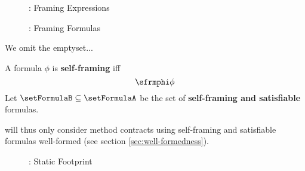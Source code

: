 
\begin{figure}
    
    \caption{\svlidf: Framing Expressions}
\end{figure}

\begin{figure}
    
    \caption{\svlidf: Framing Formulas}
\end{figure}

We omit the emptyset... 

\begin{definition}
    A formula $\phi$ is \textbf{self-framing} iff
    \begin{displaymath}
    \sfrmphi \phi
    \end{displaymath}
    Let $\setFormulaB \subseteq \setFormulaA$ be the set of \textbf{self-framing and satisfiable} formulas.
\end{definition}


\svl will thus only consider method contracts using self-framing and satisfiable formulas well-formed (see section \ref{sec:well-formedness}).

\begin{figure}
    
    \caption{\svlidf: Static Footprint}
\end{figure}

